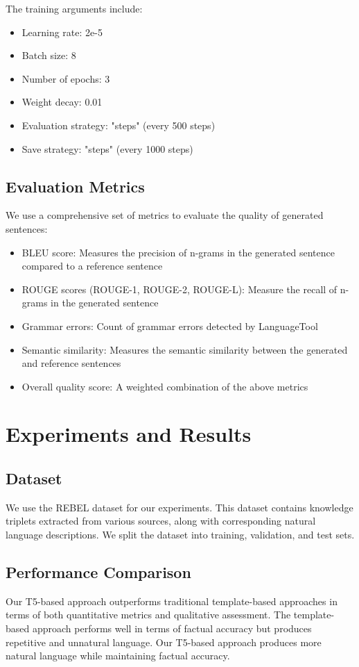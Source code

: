 \documentclass[3p,times,procedia]{elsarticle}
\begin{document}
The training arguments include:
\begin{itemize}
    \item Learning rate: 2e-5
    \item Batch size: 8
    \item Number of epochs: 3
    \item Weight decay: 0.01
    \item Evaluation strategy: "steps" (every 500 steps)
    \item Save strategy: "steps" (every 1000 steps)
\end{itemize}

\subsection{Evaluation Metrics}
We use a comprehensive set of metrics to evaluate the quality of generated sentences:
\begin{itemize}
    \item BLEU score: Measures the precision of n-grams in the generated sentence compared to a reference sentence
    \item ROUGE scores (ROUGE-1, ROUGE-2, ROUGE-L): Measure the recall of n-grams in the generated sentence
    \item Grammar errors: Count of grammar errors detected by LanguageTool
    \item Semantic similarity: Measures the semantic similarity between the generated and reference sentences
    \item Overall quality score: A weighted combination of the above metrics
\end{itemize}

\section{Experiments and Results}
\subsection{Dataset}
We use the REBEL dataset for our experiments. This dataset contains knowledge triplets extracted from various sources, along with corresponding natural language descriptions. We split the dataset into training, validation, and test sets.

\subsection{Performance Comparison}
Our T5-based approach outperforms traditional template-based approaches in terms of both quantitative metrics and qualitative assessment. The template-based approach performs well in terms of factual accuracy but produces repetitive and unnatural language. Our T5-based approach produces more natural language while maintaining factual accuracy.
\end{document}
